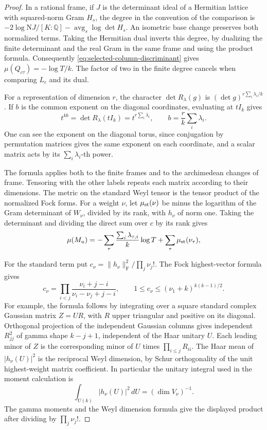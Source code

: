 \begin{proof}
In a rational frame, if \(J\) is the determinant ideal of a
Hermitian lattice with squared-norm Gram \(H_s\), the degree
in the convention of the comparison is
\(-2\log\mathrm N J/[K:\mathbb Q]-\operatorname{avg}_s\log\det H_s\).
An isometric base change preserves both normalized terms.
Taking the Hermitian dual inverts this degree, by dualizing the
finite determinant and the real Gram in the same frame and
using the product formula. Consequently
\eqref{eq:selected-column-discriminant} gives
\(\mu(Q_{c\tau})=-\log T/k\). The factor of two in the
finite degree cancels when comparing \(L_c\) and its dual.

For a representation of dimension \(r\), the character
\(\det R_\lambda(g)\) is \((\det g)^{r\sum_i\lambda_i/k}\).
If \(b\) is the common exponent on the diagonal coordinates, evaluating at \(tI_k\) gives
\[
  t^{kb}=\det R_\lambda(tI_k)=t^{r\sum_i\lambda_i},\qquad b=\frac r k\sum_i\lambda_i.
\]
One can see the exponent on the diagonal torus, since conjugation
by permutation matrices gives the same exponent on each coordinate,
and a scalar matrix acts by its \(\sum_i\lambda_i\)-th power.

The formula applies both to the finite frames and to the
archimedean changes of frame. Tensoring with the other labels
repeats each matrix according to their dimensions. The metric
on the standard Weyl tensor is the tensor product of the
normalized Fock forms. For a weight \(\nu\), let
\(\mu_{\rm st}(\nu)\) be minus the logarithm of the Gram
determinant of \(W_\nu\), divided by its rank, with \(h_\nu\)
of norm one. Taking the determinant and dividing
the direct sum over \(c\) by its rank gives
\begin{equation}\label{eq:selected-column-mean-exact}
  \mu(M_u)=
     -\sum_\tau\frac{\sum_i\lambda_{\tau,i}}{k}\log T
       +\sum_\tau\mu_{\rm st}(\nu_\tau),
\end{equation}

For the standard term put \(c_\nu=\|h_\nu\|_{\mathrm F}^2/\prod_j\nu_j!\).
The Fock highest-vector formula gives
\[
 c_\nu=\prod_{i<j}\frac{\nu_i+j-i}{\nu_i-\nu_j+j-i},
 \qquad 1\le c_\nu\le(\nu_1+k)^{k(k-1)/2}.
\]
For example, the formula follows by integrating over a square
standard complex Gaussian matrix \(Z=UR\), with \(R\) upper
triangular and positive on its diagonal. Orthogonal projection
of the independent Gaussian columns gives independent
\(R_{jj}^2\) of gamma shape \(k-j+1\), independent of the Haar
unitary \(U\). Each leading minor of \(Z\) is the corresponding
minor of \(U\) times \(\prod_{i\le j}R_{ii}\). The Haar mean of
\(|h_\nu(U)|^2\) is the reciprocal Weyl dimension, by Schur
orthogonality of the unit highest-weight matrix coefficient.
In particular the unitary integral used in the moment calculation is
\[
  \int_{U(k)}|h_\nu(U)|^2\,dU=(\dim V_\nu)^{-1}.
\]
The gamma moments and the Weyl dimension formula give the displayed
product after dividing by \(\prod_j\nu_j!\).


\end{proof}
